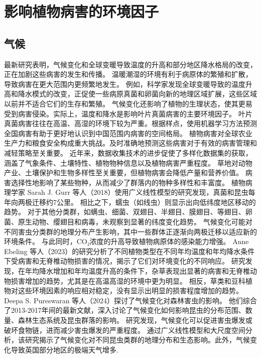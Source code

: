 \documentclass[AutoFakeBold]{LZUThesis-PgD&PhD}
\begin{document}
	
	\section{影响植物病害的环境因子}
	
	\subsection{气候}
	
	最新研究表明，气候变化和全球变暖导致温度的升高和部分地区降水格局的改变，正在加剧这些病害的发生和传播。
	温暖潮湿的环境有利于病原体的繁殖和扩散，导致病害在更大范围内更频繁地发生。
	例如，科学家发现全球变暖导致的温度升高和降水模式的改变，正促使一些病原真菌和卵菌向新的地理区域扩展，这些区域以前并不适合它们的生存和繁殖。
	气候变化还影响了植物的生理状态，使其更易受到病害侵染。实际上，温度和降水是影响叶片真菌病害的主要环境因子。
	叶片真菌病害往往在高温、高湿的环境下较为严重。根据样点，使用机器学习方法预测全国病害有助于更好地认识到中国范围内病害的空间格局。
	植物病害对全球农业生产力和粮食安全构成重大挑战。及时准确地预测这些病害对于有效的病害管理和减轻策略至关重要。
	近年来，数据收集技术的进步促使了多样化数据集的获取，涵盖了气象条件、土壤特性、植物物种信息以及植物病害严重程度。
	草地对动物产业、土壤保护和生物多样性至关重要，但植物病害会降低产量和营养价值\cite{chakraborty2018climate}。
	病害选择性地影响了某些物种，从而减少了群落内的物种多样性和丰富度\cite{grunberg2023impact}。
	植物病理学家 Sarah J. Gurr 等人（2018）使用广义线性模型的研究发现，真菌和昆虫每年向两极迁移约7公里。
	相比之下，蠕虫（如线虫）则显示出向低纬度地区移动的趋势。
	对于其他分类群，如螨虫、细菌、双翅目、半翅目、膜翅目、等翅目、卵菌、原生动物、缨翅目和病毒，未观察到显著的纬度变化趋势。
	气候变化可能对不同害虫分类群的地理分布产生影响，其中一些群体正逐渐向两极迁移以适应新的环境条件。
	与此同时，CO₂浓度的升高导致植物病原体的感染能力增强\cite{sukumar2018co2}。
	Anne Ebeling 等人（2023）的研究分析了不同植物类型在不同年均温度和年均降水条件下受病害和无脊椎动物损害的情况，揭示了它们对环境变化的不同响应。
	研究发现，在年均降水增加和年均温度升高的条件下，杂草表现出显著的病害和无脊椎动物损害增加的趋势，尤其是在高温高湿的环境中更为明显。
	相反，草类和豆科植物对这些环境因素的响应相对稳定，没有显示出明显的损害程度增加的趋势\cite{ebeling2023response}。
	Deepa S. Pureswaran 等人（2024）探讨了气候变化对森林害虫的影响。
	他们综合了2013-2017年间的最新文献，深入讨论了气候变化如何影响昆虫的分布范围、数量、森林生态系统及昆虫群落的影响。
	研究发现，气候变化可以促进害虫爆发或破坏食物链，进而减少害虫爆发的严重程度。
	通过广义线性模型和大尺度空间分析，该研究揭示了气候变化对不同昆虫类群的地理分布和生态影响。此外，气候变化导致英国部分地区的极端天气增多\cite{angelotti2024forest}.
	
\end{document}
